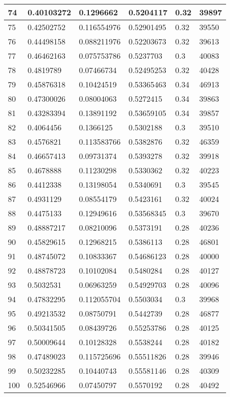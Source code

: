 \begin{longtable}{|l|l|l|l|l|l|}
74 & 0.40103272 & 0.1296662 & 0.5204117 & 0.32 & 39897 \\ \hline 
75 & 0.42502752 & 0.116554976 & 0.52901495 & 0.32 & 39550 \\ \hline 
76 & 0.44498158 & 0.088211976 & 0.52203673 & 0.32 & 39613 \\ \hline 
77 & 0.46462163 & 0.075753786 & 0.5237703 & 0.3 & 40083 \\ \hline 
78 & 0.4819789 & 0.07466734 & 0.52495253 & 0.32 & 40428 \\ \hline 
79 & 0.45876318 & 0.10424519 & 0.53365463 & 0.34 & 46913 \\ \hline 
80 & 0.47300026 & 0.08004063 & 0.5272415 & 0.34 & 39863 \\ \hline 
81 & 0.43283394 & 0.13891192 & 0.53659105 & 0.34 & 39857 \\ \hline 
82 & 0.4064456 & 0.1366125 & 0.5302188 & 0.3 & 39510 \\ \hline 
83 & 0.4576821 & 0.113583766 & 0.5382876 & 0.32 & 46359 \\ \hline 
84 & 0.46657413 & 0.09731374 & 0.5393278 & 0.32 & 39918 \\ \hline 
85 & 0.4678888 & 0.11230298 & 0.5330362 & 0.32 & 40223 \\ \hline 
86 & 0.4412338 & 0.13198054 & 0.5340691 & 0.3 & 39545 \\ \hline 
87 & 0.4931129 & 0.08554179 & 0.5423161 & 0.32 & 40024 \\ \hline 
88 & 0.4475133 & 0.12949616 & 0.53568345 & 0.3 & 39670 \\ \hline 
89 & 0.48887217 & 0.08210096 & 0.5373191 & 0.28 & 40236 \\ \hline 
90 & 0.45829615 & 0.12968215 & 0.5386113 & 0.28 & 46801 \\ \hline 
91 & 0.48745072 & 0.10833367 & 0.54686123 & 0.28 & 40000 \\ \hline 
92 & 0.48878723 & 0.10102084 & 0.5480284 & 0.28 & 40127 \\ \hline 
93 & 0.5032531 & 0.06963259 & 0.54929703 & 0.28 & 40096 \\ \hline 
94 & 0.47832295 & 0.112055704 & 0.5503034 & 0.3 & 39968 \\ \hline 
95 & 0.49213532 & 0.08750791 & 0.5442739 & 0.28 & 46877 \\ \hline 
96 & 0.50341505 & 0.08439726 & 0.55253786 & 0.28 & 40125 \\ \hline 
97 & 0.50009644 & 0.10128328 & 0.5538244 & 0.28 & 40182 \\ \hline 
98 & 0.47489023 & 0.115725696 & 0.55511826 & 0.28 & 39946 \\ \hline 
99 & 0.50232285 & 0.10440743 & 0.55581146 & 0.28 & 40309 \\ \hline 
100 & 0.52546966 & 0.07450797 & 0.5570192 & 0.28 & 40492 \\ \hline 
\end{longtable}